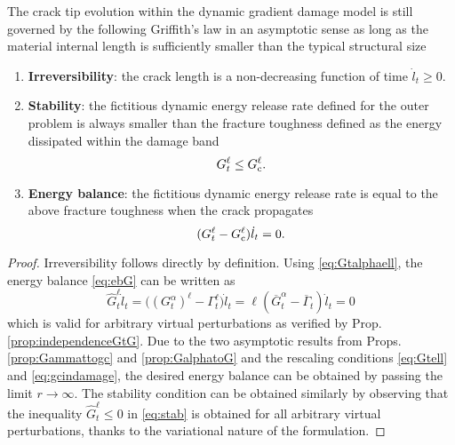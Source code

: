 \begin{proposition} \label{prop:whenellpetit}
The crack tip evolution within the dynamic gradient damage model is still governed by the following Griffith's law in an asymptotic sense as long as the material internal length is sufficiently smaller than the typical structural size
\begin{enumerate}
\item \textbf{Irreversibility}: the crack length is a non-decreasing function of time $\dot{l}_t\geq 0$.
\item \textbf{Stability}: the fictitious dynamic energy release rate defined for the outer problem is always smaller than the fracture toughness defined as the energy dissipated within the damage band
\[
G_t^\ell\leq G_\mathrm{c}^\ell.
\] 
\item \textbf{Energy balance}: the fictitious dynamic energy release rate is equal to the above fracture toughness when the crack propagates
\[
(G_t^\ell-G_\mathrm{c}^\ell)\dot{l}_t=0.
\] 
\end{enumerate}
\end{proposition}

\begin{proof}
Irreversibility follows directly by definition. Using \eqref{eq:Gtalphaell}, the energy balance \eqref{eq:ebG} can be written as
\[
\widehat{G}^\ell_t\dot{l}_t=\bigl((G^\alpha_t)^\ell-\Gamma_t^\ell\bigr)\dot{l}_t=\ell(\overline{G}_t^\alpha-\overline{\Gamma}_t)\dot{l}_t=0
\]
which is valid for arbitrary virtual perturbations as verified by Prop. \ref{prop:independenceGtG}. Due to the two asymptotic results from Props. \ref{prop:Gammattogc} and \ref{prop:GalphatoG} and the rescaling conditions \eqref{eq:Gtell} and \eqref{eq:gcindamage}, the desired energy balance can be obtained by passing the limit $r\to\infty$. The stability condition can be obtained similarly by observing that the inequality $\widehat{G}^\ell_t\leq 0$ in \eqref{eq:stab} is obtained for all arbitrary virtual perturbations, thanks to the variational nature of the formulation.
\end{proof}

